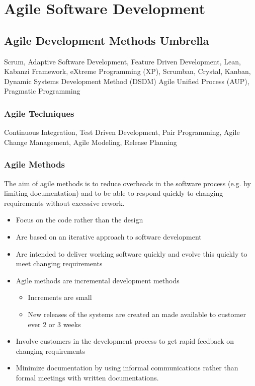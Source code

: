 \documentclass{report}
\begin{document}
\chapter{Agile Software Development} 
\section{Agile Development Methods Umbrella}
\noindent Scrum, Adaptive Software Development, Feature Driven Development, Lean, Kabanzi Framework, eXtreme Programming (XP), Scrumban, Crystal, Kanban, Dynamic Systems Development Method (DSDM) Agile Unified Process (AUP), Pragmatic Programming

\subsection{Agile Techniques}
\noindent Continuous Integration, Test Driven Development, Pair Programming, Agile Change Management, Agile Modeling, Release Planning

\subsection{Agile Methods}
\noindent The aim of agile methods is to reduce overheads in the software process (e.g. by limiting documentation) and to be able to respond quickly to changing requirements without excessive rework.
\begin{itemize}
  \item Focus on the code rather than the design
  \item Are based on an iterative approach to software development
  \item Are intended to deliver working software quickly and evolve this quickly to meet changing requirements
  \item Agile methods are incremental development methods
  \begin{itemize}
    \item Increments are small
    \item New releases of the systems are created an made available to customer ever 2 or 3 weeks
  \end{itemize}
  \item Involve customers in the development process to get rapid feedback on changing requirements
  \item Minimize documentation by using informal communications rather than formal meetings with written documentations.
\end{itemize}
\end{document}
